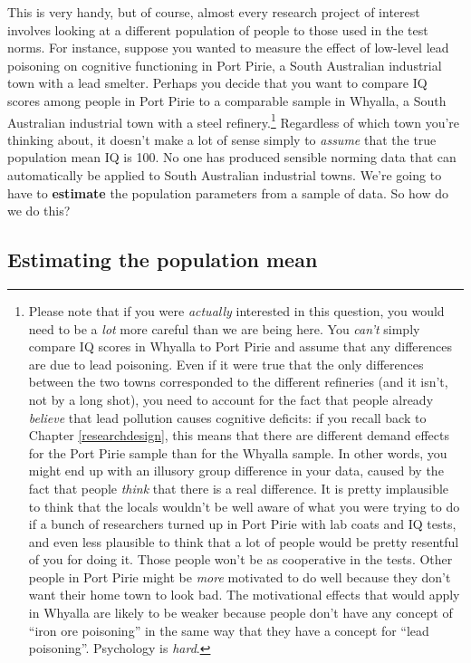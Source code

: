 \documentclass[
  11pt,
  a4paper,
  twoside,symmetric,openright]{book}
\theoremstyle{break}
\theoremstyle{break}
\begin{document}
This is very handy, but of course, almost every research project of interest involves looking at a different population of people to those used in the test norms. For instance, suppose you wanted to measure the effect of low-level lead poisoning on cognitive functioning in Port Pirie, a South Australian industrial town with a lead smelter. Perhaps you decide that you want to compare IQ scores among people in Port Pirie to a comparable sample in Whyalla, a South Australian industrial town with a steel refinery.\footnote{Please note that if you were \emph{actually} interested in this question, you would need to be a \emph{lot} more careful than we are being here. You \emph{can't} simply compare IQ scores in Whyalla to Port Pirie and assume that any differences are due to lead poisoning. Even if it were true that the only differences between the two towns corresponded to the different refineries (and it isn't, not by a long shot), you need to account for the fact that people already \emph{believe} that lead pollution causes cognitive deficits: if you recall back to Chapter \ref{researchdesign}, this means that there are different demand effects for the Port Pirie sample than for the Whyalla sample. In other words, you might end up with an illusory group difference in your data, caused by the fact that people \emph{think} that there is a real difference. It is pretty implausible to think that the locals wouldn't be well aware of what you were trying to do if a bunch of researchers turned up in Port Pirie with lab coats and IQ tests, and even less plausible to think that a lot of people would be pretty resentful of you for doing it. Those people won't be as cooperative in the tests. Other people in Port Pirie might be \emph{more} motivated to do well because they don't want their home town to look bad. The motivational effects that would apply in Whyalla are likely to be weaker because people don't have any concept of ``iron ore poisoning'' in the same way that they have a concept for ``lead poisoning''. Psychology is \emph{hard}.} Regardless of which town you're thinking about, it doesn't make a lot of sense simply to \emph{assume} that the true population mean IQ is 100. No one has produced sensible norming data that can automatically be applied to South Australian industrial towns. We're going to have to \textbf{estimate} the population parameters from a sample of data. So how do we do this?

\subsection{Estimating the population mean}\label{estimating-the-population-mean}
\end{document}
